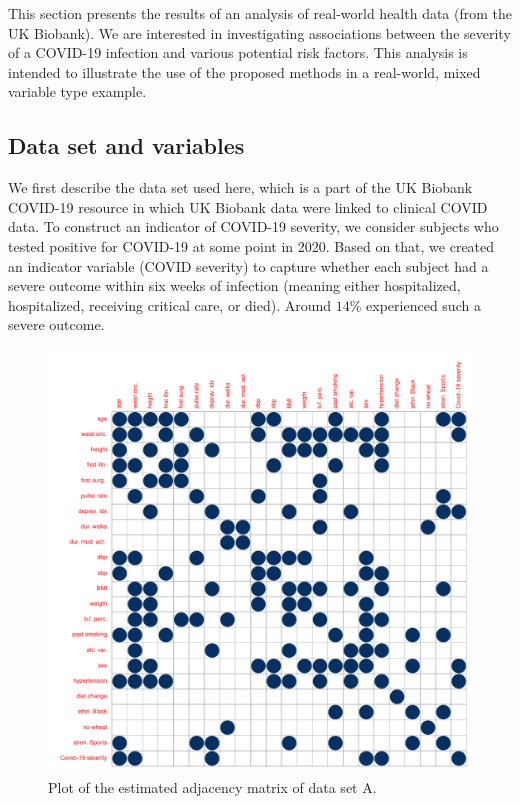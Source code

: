 
This section presents the results of an analysis of real-world health data (from the UK Biobank). We are interested in investigating associations between the severity of a COVID-19 infection and various potential risk factors.
This analysis is intended to illustrate the use of the proposed methods in a real-world, mixed variable type example.


\subsection{Data set and variables}

We first describe the data set used here, which is a part of the UK Biobank COVID-19 resource in which UK Biobank data were linked to clinical COVID data. To construct an indicator of COVID-19 severity, we consider subjects who tested positive for COVID-19 at some point in 2020. Based on that, we created an indicator variable (COVID severity) to capture whether each subject had a severe outcome within six weeks of infection (meaning either hospitalized, hospitalized, receiving critical care, or died). Around $14\%$ experienced such a severe outcome. \begin{figure}[ht]
    \centering
    \includegraphics[scale=.6]{Figures/corrplot_admat_A.pdf}
    \caption{Plot of the estimated adjacency matrix of data set A.}
    \label{fig:corrplot_admat_A}
\end{figure}
